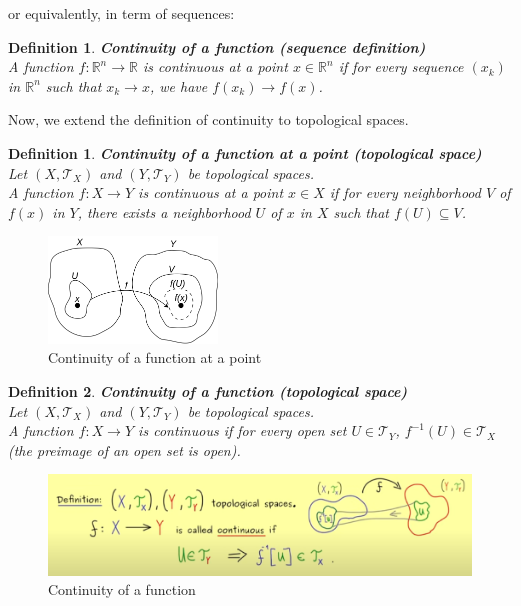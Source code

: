 \documentclass[11pt]{book} %
\newtheorem{definition}{Definition}[section]
\newtheorem*{definition*}{Definition}
\begin{document}
or equivalently, in term of sequences:
\begin{definition*}{\textbf{Continuity of a function (sequence definition)}} \\
    A function \( f: \mathbb{R}^n \to \mathbb{R} \) is continuous at a point \( x \in \mathbb{R}^n \) 
    if for every sequence \( (x_k) \) in \( \mathbb{R}^n \) such that \( x_k \to x \), we have \( f(x_k) \to f(x) \).
\end{definition*}

Now, we extend the definition of continuity to topological spaces.

\begin{definition}{\textbf{Continuity of a function at a point (topological space)}} \\
    Let \( (X, \mathcal{T}_X) \) and \( (Y, \mathcal{T}_Y) \) be topological spaces. \\
    A function \( f: X \to Y \) is continuous at a point \( x \in X \) if for every neighborhood \( V \) of \( f(x) \) in \( Y \),
    there exists a neighborhood \( U \) of \( x \) in \( X \) such that \( f(U) \subseteq V \).
\end{definition}

\begin{figure}[H]
    \centering
    \includegraphics[width=0.4\textwidth]{Figs/continuity_topology.png}
    \caption{Continuity of a function at a point} 
\end{figure}


\begin{definition}{\textbf{Continuity of a function (topological space)}} \\
    Let \( (X, \mathcal{T}_X) \) and \( (Y, \mathcal{T}_Y) \) be topological spaces. \\
    A function \( f: X \to Y \) is continuous if for every open set \( U \in \mathcal{T}_Y \), \( f^{-1}(U) \in \mathcal{T}_X \) \\
    (the preimage of an open set is open).
\end{definition}

\begin{figure}[H]
    \centering
    \includegraphics[width=\textwidth]{Figs/continuity.png}
    \caption{Continuity of a function}    
\end{figure}
\end{document}
